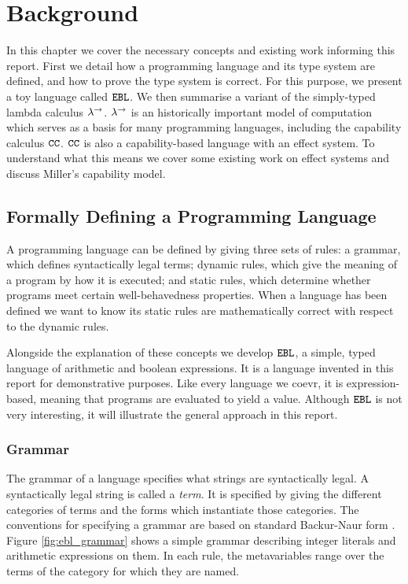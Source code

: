 \chapter{Background}\label{C:background}

In this chapter we cover the necessary concepts and existing work informing this report. First we detail how a programming language and its type system are defined, and how to prove the type system is correct. For this purpose, we present a toy language called $\mathtt{EBL}$. We then summarise a variant of the simply-typed lambda calculus $\lambda^{\rightarrow}$. $\lambda^{\rightarrow}$ is an historically important model of computation which serves as a basis for many programming languages, including the capability calculus $\mathtt{CC}$. $\mathtt{CC}$ is also a capability-based language with an effect system. To understand what this means we cover some existing work on effect systems and discuss Miller's capability model.

\section{Formally Defining a Programming Language}

A programming language can be defined by giving three sets of rules: a grammar, which defines syntactically legal terms; dynamic rules, which give the meaning of a program by how it is executed; and static rules, which determine whether programs meet certain well-behavedness properties. When a language has been defined we want to know its static rules are mathematically correct with respect to the dynamic rules.

Alongside the explanation of these concepts we develop $\mathtt{EBL}$, a simple, typed language of arithmetic and boolean expressions. It is a language invented in this report for demonstrative purposes. Like every language we coevr, it is expression-based, meaning that programs are evaluated to yield a value. Although $\mathtt{EBL}$ is not very interesting, it will illustrate the general approach in this report.

\subsection{Grammar}

The grammar of a language specifies what strings are syntactically legal. A syntactically legal string is called a \textit{term}. It is specified by giving the different categories of terms and the forms which instantiate those categories. The conventions for specifying a grammar are based on standard Backur-Naur form \cite{bnf}. Figure \ref{fig:ebl_grammar} shows a simple grammar describing integer literals and arithmetic expressions on them. In each rule, the metavariables range over the terms of the category for which they are named.

